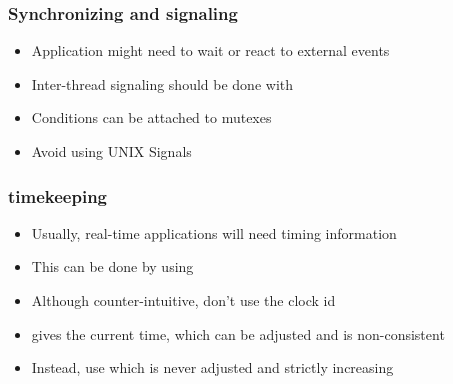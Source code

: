 \begin{frame}
	\frametitle{Synchronizing and signaling}
	\begin{itemize}
		\item Application might need to wait or react to external events
		\item Inter-thread signaling should be done with 
		\item Conditions can be attached to mutexes
		\item Avoid using UNIX Signals
	\end{itemize}
\end{frame}

\begin{frame}
	\frametitle{timekeeping}
	\begin{itemize}
		\item Usually, real-time applications will need timing information
		\item This can be done by using 
		\item Although counter-intuitive, don't use the  clock id
		\item {} gives the current time, which can be adjusted and is non-consistent
		\item Instead, use  which is never adjusted and strictly increasing
	\end{itemize}
\end{frame}
